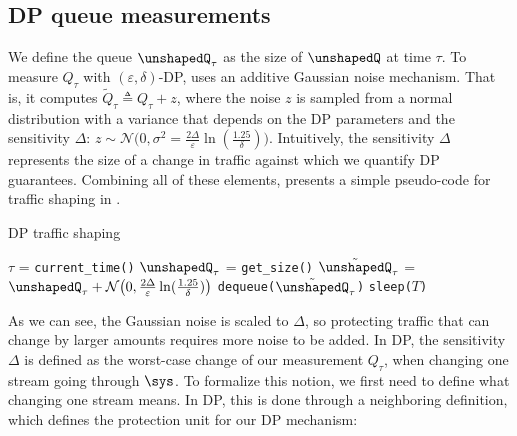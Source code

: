 \subsection{DP queue measurements}
\label{subsec:dp-queue-measurements}
We define the queue $\unshapedQ_{\tau}$ as the size of {$\unshapedQ$} at time $\tau$.
To measure $Q_\tau$ with $(\varepsilon, \delta)$-DP, {\sys} uses an additive Gaussian noise mechanism.
That is, it computes $\tilde{Q}_\tau \triangleq Q_\tau + z$, where the noise $z$
is sampled from a normal distribution with a variance that depends on the DP
parameters and the sensitivity $\Delta$: $z \sim \mathcal{N}\big(0, \sigma^2 =
\frac{2\Delta}{\varepsilon}\ln(\frac{1.25}{\delta})\big)$.
Intuitively, the sensitivity $\Delta$ represents the size of a change in traffic
against which we quantify DP guarantees. Combining all of these elements,  presents a simple pseudo-code for traffic shaping in {\sys}.

\begin{algorithm}[t]
  \caption{{\sys} DP traffic shaping}
  \label{alg:dp_shaping_mechanism}
  \begin{algorithmic}[1]
    \State $\tau$ = \texttt{current\_time()}
    \State $\unshapedQ_{\tau}$ = \texttt{get\_size()}
    \State $\tilde{\unshapedQ}_{\tau}$ = $\unshapedQ_{\tau} +
    \mathcal{N}\big(0, \frac{2\Delta}{\varepsilon}\ln(\frac{1.25}{\delta})\big)$ \;
    \State \texttt{dequeue($\tilde{\unshapedQ}_{\tau}$)}
    \State \texttt{sleep($T$)}
  \EndWhile
  \end{algorithmic}
\end{algorithm}



As we can see, the Gaussian noise is scaled to $\Delta$, so protecting traffic
that can change by larger amounts requires more noise to be added.
In DP, the sensitivity $\Delta$ is defined as the worst-case change of our
measurement $Q_\tau$, when changing one stream going through {$\sys$}.
To formalize this notion, we first need to define what changing one stream means.
In DP, this is done through a neighboring definition, which defines the
protection unit for our DP mechanism:

